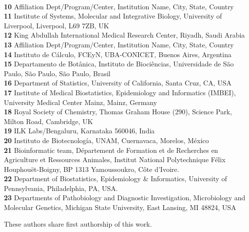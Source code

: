 \documentclass[10pt,letterpaper]{article}
\begin{document}
\begin{flushleft}
\\
\textbf{10} Affiliation Dept/Program/Center, Institution Name, City, State, Country
\\
\textbf{11} Institute of Systems, Molecular and Integrative Biology, University of Liverpool, Liverpool, L69 7ZB, UK
\\
\textbf{12} King Abdullah International Medical Research Center, Riyadh, Saudi Arabia
\\
\textbf{13} Affiliation Dept/Program/Center, Institution Name, City, State, Country
\\
\textbf{14} Instituto de Cálculo, FCEyN, UBA-CONICET, Buenos Aires, Argentina
\\
\textbf{15} Departamento de Botânica, Instituto de Biociências, Universidade de São Paulo, São Paulo, São Paulo, Brasil
\\
\textbf{16} Department of Statistics, University of California, Santa Cruz, CA, USA
\\
\textbf{17} Institute of Medical Biostatistics, Epidemiology and Informatics (IMBEI), University Medical Center Mainz, Mainz, Germany
\\
\textbf{18} Royal Society of Chemistry, Thomas Graham House (290), Science Park, Milton Road, Cambridge, UK
\\
\textbf{19} ILK Labs/Bengaluru, Karnataka 560046, India
\\
\textbf{20} Instituto de Biotecnología, UNAM, Cuernavaca, Morelos, México
\\
\textbf{21} Bioinformatic team, Département de Formation et de Recherches en Agriculture et Ressources Animales, Institut National Polytechnique Félix Houphouët-Boigny, BP 1313 Yamoussoukro, Côte d’Ivoire.
\\
\textbf{22} Department of Biostatistics, Epidemiology \& Informatics, University of Pennsylvania, Philadelphia, PA, USA.
\\
\textbf{23} Departments of Pathobiology and Diagnostic Investigation, Microbiology and Molecular Genetics, Michigan State University, East Lansing, MI 48824, USA
\\
\bigskip

% 
%
\Yinyang These authors share first authorship of this work.



\end{flushleft}
\end{document}
